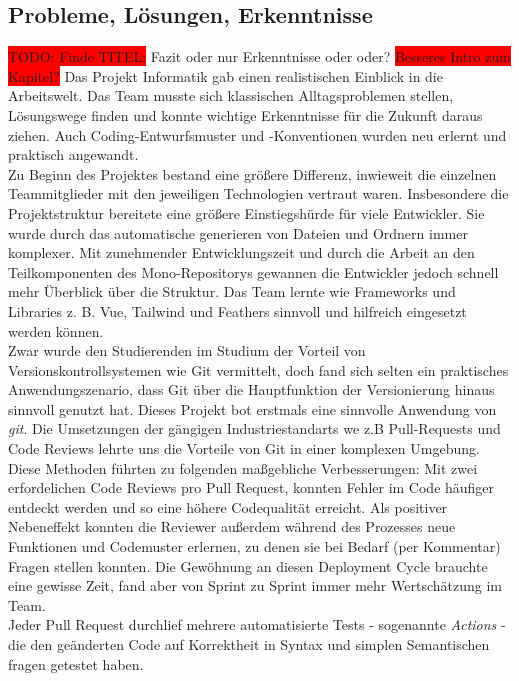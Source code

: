 \documentclass[10pt, a4paper]{article}
\begin{document}
\begin{onehalfspace}
\subsection{Probleme, Lösungen, Erkenntnisse}
\colorbox{red}{TODO: Finde TITEL:} Fazit oder nur Erkenntnisse oder oder?
\colorbox{red}{Besseres Intro zum Kapitel?}
Das Projekt Informatik gab einen realistischen Einblick in die Arbeitswelt.
Das Team musste sich klassischen Alltagsproblemen stellen, Lösungswege finden und konnte wichtige Erkenntnisse für die Zukunft daraus ziehen.
Auch Coding-Entwurfsmuster und -Konventionen wurden neu erlernt und praktisch angewandt.
$~$ \\
Zu Beginn des Projektes bestand eine größere Differenz, inwieweit die einzelnen Teammitglieder mit den jeweiligen Technologien vertraut waren.
Insbesondere die Projektstruktur bereitete eine größere Einstiegshürde für viele Entwickler.
Sie wurde durch das automatische generieren von Dateien und Ordnern immer komplexer.
Mit zunehmender Entwicklungszeit und durch die Arbeit an den Teilkomponenten des Mono-Repositorys gewannen die Entwickler jedoch schnell mehr Überblick über die Struktur.
Das Team lernte wie Frameworks und Libraries  z. B. Vue, Tailwind und Feathers sinnvoll und hilfreich eingesetzt werden können.
$~$ \\
Zwar wurde den Studierenden im Studium der Vorteil von Versionskontrollsystemen wie Git vermittelt, doch fand sich selten ein praktisches Anwendungszenario, dass Git über die Hauptfunktion der Versionierung hinaus sinnvoll genutzt hat.
Dieses Projekt bot erstmals eine sinnvolle Anwendung von \textit{git}.
Die Umsetzungen der gängigen Industriestandarts we z.B Pull-Requests und Code Reviews lehrte uns die Vorteile von Git in einer komplexen Umgebung.
Diese Methoden führten zu folgenden maßgebliche Verbesserungen:
Mit zwei erfordelichen Code Reviews pro Pull Request, konnten Fehler im Code häufiger entdeckt werden und so eine höhere Codequalität erreicht.
Als positiver Nebeneffekt konnten die Reviewer außerdem während des Prozesses neue Funktionen und Codemuster erlernen, zu denen sie bei Bedarf (per Kommentar) Fragen stellen konnten.
Die Gewöhnung an diesen Deployment Cycle brauchte eine gewisse Zeit, fand aber von Sprint zu Sprint immer mehr Wertschätzung im Team.
$~$ \\
Jeder Pull Request durchlief mehrere automatisierte Tests - sogenannte \textit{Actions} - die den geänderten Code auf Korrektheit in Syntax und simplen Semantischen fragen getestet haben.

\end{onehalfspace}
\end{document}

